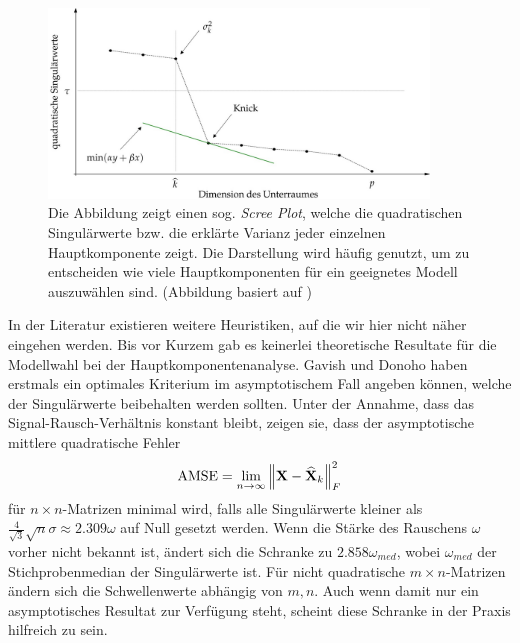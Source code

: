 \begin{figure}
\includegraphics[width=0.9\textwidth]{figures/scree_plot_explanation.jpg}
\caption{Die Abbildung zeigt einen sog. \textit{Scree Plot}, welche die quadratischen Singulärwerte bzw. die erklärte Varianz jeder einzelnen Hauptkomponente zeigt. Die Darstellung wird häufig genutzt, um zu entscheiden wie viele Hauptkomponenten für ein geeignetes Modell auszuwählen sind. (Abbildung basiert auf \cite{vidal})}
\label{scree_plot}
\end{figure}

In der Literatur existieren weitere Heuristiken, auf die wir hier nicht näher eingehen werden. Bis vor Kurzem gab es keinerlei theoretische Resultate für die Modellwahl bei der Hauptkomponentenanalyse. Gavish und Donoho \cite{gavish} haben erstmals ein optimales Kriterium im asymptotischem Fall angeben können, welche der Singulärwerte beibehalten werden sollten. Unter der Annahme, dass das Signal-Rausch-Verhältnis konstant bleibt, zeigen sie, dass der asymptotische mittlere quadratische Fehler 
$$\operatorname{AMSE} = \lim_{n \rightarrow \infty} \left\lVert \mathbf{X} - \widehat{\mathbf{X}}_k \right\rVert_{F}^{2}$$
für $n \times n$-Matrizen minimal wird, falls alle Singulärwerte kleiner als $\frac{4}{\sqrt{3}}\sqrt{n}\sigma \approx 2.309\omega$ auf Null gesetzt werden. Wenn die Stärke des Rauschens $\omega$ vorher nicht bekannt ist, ändert sich die Schranke zu $2.858\omega_{med}$, wobei $\omega_{med}$ der Stichprobenmedian der Singulärwerte ist. Für nicht quadratische $m \times n$-Matrizen ändern sich die Schwellenwerte abhängig von $m,n$. Auch wenn damit nur ein asymptotisches Resultat zur Verfügung steht, scheint diese Schranke in der Praxis hilfreich zu sein.




